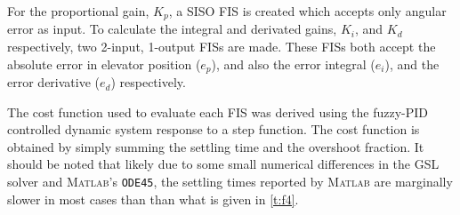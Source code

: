 For the proportional gain, $K_p$, a SISO FIS is created which accepts only angular error as input. To
calculate the integral and derivated gains, $K_i$, and $K_d$ respectively, two 2-input, 1-output FISs are
made. These FISs both accept the absolute error in elevator position ($e_p$), and also the error integral
($e_i$), and the error derivative ($e_d$) respectively.

The cost function used to evaluate each FIS was derived using the fuzzy-PID controlled dynamic system response
to a step function. The cost function is obtained by simply summing the settling time and the overshoot
fraction. It should be noted that likely due to some small numerical differences in the GSL solver and
\textsc{Matlab}'s \verb|ODE45|, the settling times reported by \textsc{Matlab} are marginally slower in most
cases than than what is given in \cref{t:f4}.

